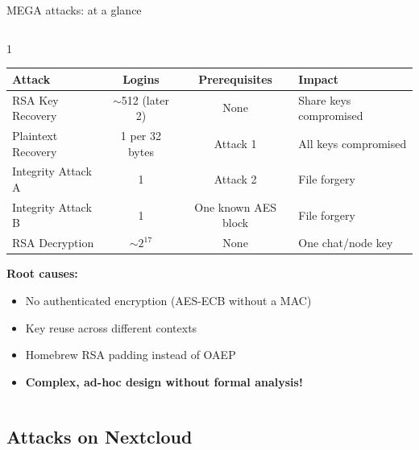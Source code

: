 \ifdefined\PRESENTATION\else\PassOptionsToClass{handout}{beamer}\fi\documentclass[aspectratio=169, lualatex]{beamer}
\begin{document}
\begin{frame}{MEGA attacks: at a glance}
	\begin{columns}[c]
		\begin{column}{1\textwidth}
			\begin{table}
				\centering
				\small
				\begin{tabular}{|l|c|c|l|}
					\hline
					\textbf{Attack}    & \textbf{Logins}         & \textbf{Prerequisites} & \textbf{Impact}             \\
					\hline
					RSA Key Recovery   & ${\sim}$512 (later 2)   & None                   & Share keys compromised      \\
					\hline
					Plaintext Recovery & 1 per 32 bytes          & Attack 1               & All keys compromised        \\
					\hline
					Integrity Attack A & 1                       & Attack 2               & File forgery                \\
					\hline
					Integrity Attack B & 1                       & One known AES block    & File forgery                \\
					\hline
					RSA Decryption     & ${\sim}2^{17}$          & None                   & One chat/node key           \\
					\hline
				\end{tabular}
			\end{table}
			\vspace{0.3cm}
			\textbf{Root causes:}
			\begin{itemize}
				\item No authenticated encryption (AES-ECB without a MAC)
				\item Key reuse across different contexts
				\item Homebrew RSA padding instead of OAEP
				\item \textbf{Complex, ad-hoc design without formal analysis!}
			\end{itemize}
		\end{column}
	\end{columns}
\end{frame}

\subsection{Attacks on Nextcloud}
\end{document}
